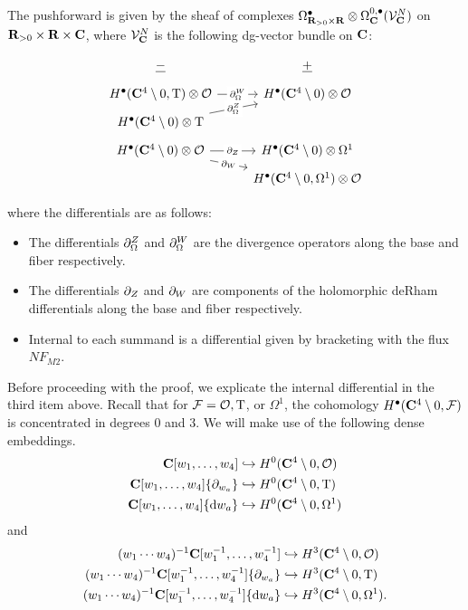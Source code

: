 \documentclass[../main.tex]{subfiles}
\begin{document}
\begin{prop}\label{prop:pushads4}
The pushforward is given by the sheaf of complexes $\Omega^\bullet_{\mathbf{R}_{>0}\times \mathbf{R}} \otimes \Omega^{0,\bullet}_{\mathbf{C}} (\mathcal{V}^N_{\mathbf{C}})$ on $\mathbf{R}_{>0}\times \mathbf{R}\times \mathbf{C}$, where $\mathcal{V}^N_{\mathbf{C}}$ is the following dg-vector bundle on $\mathbf{C}$:

\begin{equation}
  \begin{tikzcd}[row sep = 1 ex]
    \ul{-} & \ul{+} \\ 
H^\bullet (\C^{4}\setminus 0, \T) \otimes \mc{O}\ar[r, "\del^W_\Omega" description] & H^\bullet (\C^{4}\setminus 0) \otimes \mc O \\
H^\bullet (\C^{4}\setminus 0)  \otimes \T\ar[ur, "\del^Z_\Omega" description] \\
H^\bullet (\C^{4}\setminus 0)\otimes \mc{O}\ar[r, "\del_Z" description]\ar[dr, "\del_W" description] & H^\bullet (\C^{4}\setminus 0) \otimes \Omega^1 \\ & H^\bullet (\C^{4}\setminus 0, \Omega^1)  \otimes \mc O
\end{tikzcd}
\end{equation}

where the differentials are as follows:
\begin{itemize}
\item The differentials $\partial_\Omega^Z$ and $\partial_\Omega^W$ are the divergence operators along the base and fiber respectively.
\item The differentials $\partial_Z$ and $\partial_W$ are components of the holomorphic deRham differentials along the base and fiber respectively.
\item  Internal to each summand is a differential given by bracketing with the flux $NF_{M2}$. 
\end{itemize}
\end{prop} 

Before proceeding with the proof, we explicate the internal differential in the third item above. Recall that for $\mathcal{F} = \mathcal{O}, {\mathrm{T}}$, or $\Omega^1$, the cohomology $H^\bullet(\mathbf{C}^4 \setminus 0, \mathcal{F})$ is concentrated in degrees $0$ and $3$. We will make use of the following dense embeddings.
\begin{align*}
\mathbf{C}[w_1,\ldots, w_4] & \hookrightarrow H^0(\mathbf{C}^4 \setminus 0, \mathcal{O}) \\ 
\mathbf{C}[w_1,\ldots, w_4] \{\partial_{w_a}\} & \hookrightarrow H^0(\mathbf{C}^4 \setminus 0, {\mathrm{T}}) \\
\mathbf{C}[w_1,\ldots, w_4] \{\mathrm{d} w_a\} & \hookrightarrow H^0(\mathbf{C}^4 \setminus 0, \Omega^1) 
\end{align*}
and
\begin{align*}
(w_1\cdots w_4)^{-1} \mathbf{C}[w_1^{-1},\ldots, w_4^{-1}] & \hookrightarrow H^3(\mathbf{C}^4 \setminus 0, \mathcal{O}) \\ 
(w_1\cdots w_4)^{-1} \mathbf{C}[w_1^{-1},\ldots, w_4^{-1}] \{\partial_{w_a}\} & \hookrightarrow H^3(\mathbf{C}^4 \setminus 0, {\mathrm{T}}) \\
(w_1\cdots w_4)^{-1} \mathbf{C}[w_1^{-1},\ldots, w_4^{-1}] \{\mathrm{d} w_a\} & \hookrightarrow H^3(\mathbf{C}^4 \setminus 0, \Omega^1) .
\end{align*}
\end{document}

